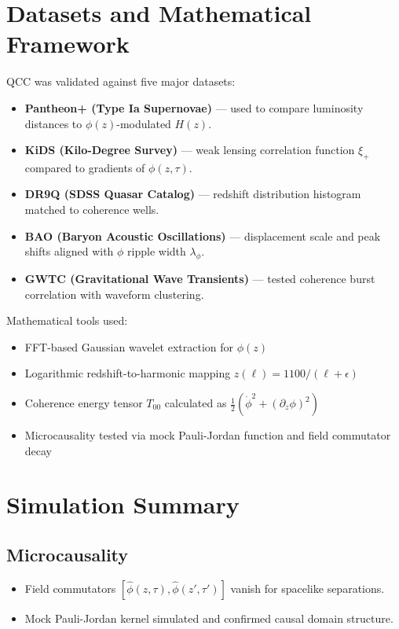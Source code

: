 \documentclass[11pt]{article}
\begin{document}
\section{Datasets and Mathematical Framework}

QCC was validated against five major datasets:
\begin{itemize}
\item \textbf{Pantheon+ (Type Ia Supernovae)} — used to compare luminosity distances to $\phi(z)$-modulated $H(z)$.
\item \textbf{KiDS (Kilo-Degree Survey)} — weak lensing correlation function $\xi_+$ compared to gradients of $\phi(z, \tau)$.
\item \textbf{DR9Q (SDSS Quasar Catalog)} — redshift distribution histogram matched to coherence wells.
\item \textbf{BAO (Baryon Acoustic Oscillations)} — displacement scale and peak shifts aligned with $\phi$ ripple width $\lambda_\phi$.
\item \textbf{GWTC (Gravitational Wave Transients)} — tested coherence burst correlation with waveform clustering.
\end{itemize}

Mathematical tools used:
\begin{itemize}
\item FFT-based Gaussian wavelet extraction for $\phi(z)$
\item Logarithmic redshift-to-harmonic mapping $z(\ell) = 1100 / (\ell + \epsilon)$
\item Coherence energy tensor $T_{00}$ calculated as $\frac{1}{2}(\dot{\phi}^2 + (\partial_z \phi)^2)$
\item Microcausality tested via mock Pauli-Jordan function and field commutator decay
\end{itemize}

\section{Simulation Summary}

\subsection*{Microcausality}
\begin{itemize}
\item Field commutators $[\hat{\phi}(z, \tau), \hat{\phi}(z', \tau')]$ vanish for spacelike separations.
\item Mock Pauli-Jordan kernel simulated and confirmed causal domain structure.
\end{itemize}
\end{document}
